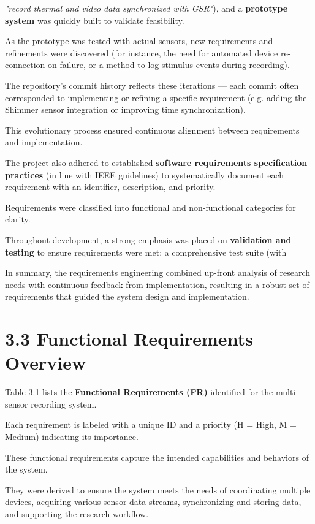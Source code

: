 \textit{"record thermal and video data synchronized with GSR"}), and a \textbf{prototype system}
 was quickly built to validate feasibility.

As the prototype was tested with actual sensors, new requirements and refinements were discovered (for instance, the need for automated device re-connection on failure, or a method to log stimulus events during recording).

The repository's commit history reflects these iterations --- each commit often corresponded to implementing or refining a specific requirement (e.g. adding the Shimmer sensor integration or improving time synchronization).

This evolutionary process ensured continuous alignment between requirements and implementation.

The project also adhered to established \textbf{software requirements specification practices}
 (in line with IEEE guidelines) to systematically document each requirement with an identifier, description, and priority.

Requirements were classified into functional and non-functional categories for clarity.

Throughout development, a strong emphasis was placed on \textbf{validation and testing}
 to ensure requirements were met: a comprehensive test suite (with %

In summary, the requirements engineering combined up-front analysis of research needs with continuous feedback from implementation, resulting in a robust set of requirements that guided the system design and implementation.

\section{3.3 Functional Requirements Overview}

Table 3.1 lists the \textbf{Functional Requirements (FR)}
 identified for the multi-sensor recording system.

Each requirement is labeled with a unique ID and a priority (H = High, M = Medium) indicating its importance.

These functional requirements capture the intended capabilities and behaviors of the system.

They were derived to ensure the system meets the needs of coordinating multiple devices, acquiring various sensor data streams, synchronizing and storing data, and supporting the research workflow.

